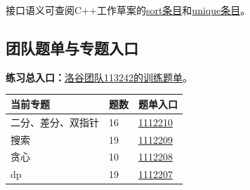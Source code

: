 接口语义可查阅C++工作草案的\href{https://eel.is/c++draft/sort}{sort条目}和\href{https://eel.is/c++draft/alg.unique}{unique条目}。

\subsection{团队题单与专题入口}
\textbf{练习总入口：}\href{https://www.luogu.com.cn/team/113242/training}{洛谷团队113242的训练题单}。
\begin{longtable}{P{7cm}P{2cm}P{5cm}}
\toprule 当前专题 & 题数 & 题单入口\\\midrule\endhead
二分、差分、双指针 & 16 & \href{https://www.luogu.com.cn/training/1112210}{1112210}\\
搜索 & 19 & \href{https://www.luogu.com.cn/training/1112209}{1112209}\\
贪心 & 10 & \href{https://www.luogu.com.cn/training/1112208}{1112208}\\
dp & 19 & \href{https://www.luogu.com.cn/training/1112207}{1112207}\\
\bottomrule\end{longtable}

